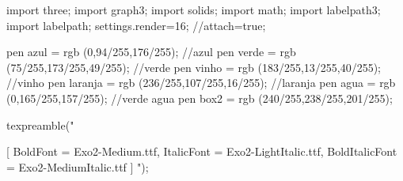 \RequirePackage{attachfile2}

\begin{asydef}
	import three;
	import graph3;
	import solids;
	import math;
	import labelpath3;
	import labelpath;
	settings.render=16;
	//attach=true;

	pen azul = rgb (0,94/255,176/255); //azul
	pen verde = rgb (75/255,173/255,49/255); //verde
	pen vinho = rgb (183/255,13/255,40/255); //vinho
	pen laranja = rgb (236/255,107/255,16/255); //laranja
	pen agua = rgb (0,165/255,157/255); //verde agua
	pen box2 = rgb (240/255,238/255,201/255);


	texpreamble("
		\usepackage{fontspec}
		\setmainfont{Exo2-Light.ttf}[
			BoldFont = Exo2-Medium.ttf,
			ItalicFont = Exo2-LightItalic.ttf,
			BoldItalicFont = Exo2-MediumItalic.ttf
		]
	");
\end{asydef}